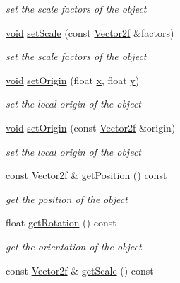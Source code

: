 \begin{DoxyCompactItemize}
\begin{DoxyCompactList}\small\item\em set the scale factors of the object \end{DoxyCompactList}\item 
\hyperlink{glutf90_8h_ac778d6f63f1aaf8ebda0ce6ac821b56e}{void} \hyperlink{classsf_1_1_transformable_a4c48a87f1626047e448f9c1a68ff167e}{set\-Scale} (const \hyperlink{namespacesf_acf03098c2577b869e2fa6836cc48f1a0}{Vector2f} \&factors)
\begin{DoxyCompactList}\small\item\em set the scale factors of the object \end{DoxyCompactList}\item 
\hyperlink{glutf90_8h_ac778d6f63f1aaf8ebda0ce6ac821b56e}{void} \hyperlink{classsf_1_1_transformable_a56c67bd80aae8418d13fb96c034d25ec}{set\-Origin} (float \hyperlink{gl3_8h_a92d0386e5c19fb81ea88c9f99644ab1d}{x}, float \hyperlink{gl3_8h_a66ddd433d2cacfe27f5906b7e86faeed}{y})
\begin{DoxyCompactList}\small\item\em set the local origin of the object \end{DoxyCompactList}\item 
\hyperlink{glutf90_8h_ac778d6f63f1aaf8ebda0ce6ac821b56e}{void} \hyperlink{classsf_1_1_transformable_aa93a835ffbf3bee2098dfbbc695a7f05}{set\-Origin} (const \hyperlink{namespacesf_acf03098c2577b869e2fa6836cc48f1a0}{Vector2f} \&origin)
\begin{DoxyCompactList}\small\item\em set the local origin of the object \end{DoxyCompactList}\item 
const \hyperlink{namespacesf_acf03098c2577b869e2fa6836cc48f1a0}{Vector2f} \& \hyperlink{classsf_1_1_transformable_a6a0552d8cf155b7df25f6ceda8ee45a5}{get\-Position} () const 
\begin{DoxyCompactList}\small\item\em get the position of the object \end{DoxyCompactList}\item 
float \hyperlink{classsf_1_1_transformable_ad783a7e9971398ec613d22455252809e}{get\-Rotation} () const 
\begin{DoxyCompactList}\small\item\em get the orientation of the object \end{DoxyCompactList}\item 
const \hyperlink{namespacesf_acf03098c2577b869e2fa6836cc48f1a0}{Vector2f} \& \hyperlink{classsf_1_1_transformable_a3ea9639abd7a430ac99afb0aaf1ea562}{get\-Scale} () const 

\end{DoxyCompactItemize}
